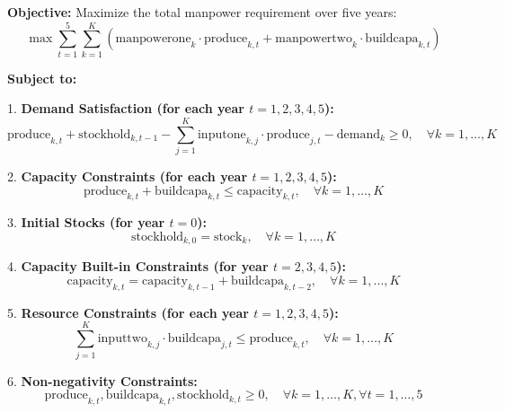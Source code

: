 \documentclass{article}
\begin{document}
\textbf{Objective:} 
Maximize the total manpower requirement over five years:
\[
\max \sum_{t=1}^{5} \sum_{k=1}^{K} \left( \text{manpowerone}_k \cdot \text{produce}_{k,t} + \text{manpowertwo}_k \cdot \text{buildcapa}_{k,t} \right)
\]

\textbf{Subject to:}

1. \textbf{Demand Satisfaction (for each year \(t = 1, 2, 3, 4, 5\)):}
\[
\text{produce}_{k,t} + \text{stockhold}_{k,t-1} - \sum_{j=1}^{K} \text{inputone}_{k,j} \cdot \text{produce}_{j,t} - \text{demand}_k \geq 0, \quad \forall k = 1, \ldots, K
\]

2. \textbf{Capacity Constraints (for each year \(t = 1, 2, 3, 4, 5\)):}
\[
\text{produce}_{k,t} + \text{buildcapa}_{k,t} \leq \text{capacity}_{k,t}, \quad \forall k = 1, \ldots, K
\]

3. \textbf{Initial Stocks (for year \(t = 0\)):}
\[
\text{stockhold}_{k,0} = \text{stock}_k, \quad \forall k = 1, \ldots, K
\]

4. \textbf{Capacity Built-in Constraints (for year \(t = 2, 3, 4, 5\)):}
\[
\text{capacity}_{k,t} = \text{capacity}_{k,t-1} + \text{buildcapa}_{k,t-2}, \quad \forall k = 1, \ldots, K
\]

5. \textbf{Resource Constraints (for each year \(t = 1, 2, 3, 4, 5\)):}
\[
\sum_{j=1}^{K} \text{inputtwo}_{k,j} \cdot \text{buildcapa}_{j,t} \leq \text{produce}_{k,t}, \quad \forall k = 1, \ldots, K
\]

6. \textbf{Non-negativity Constraints:}
\[
\text{produce}_{k,t}, \text{buildcapa}_{k,t}, \text{stockhold}_{k,t} \geq 0, \quad \forall k = 1, \ldots, K, \forall t = 1, \ldots, 5
\]
\end{document}
